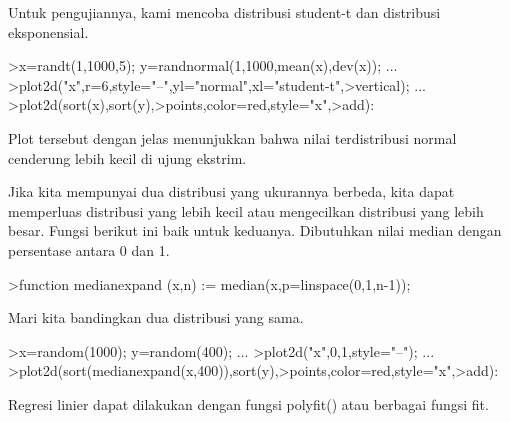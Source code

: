 \documentclass[a4paper,10pt]{article}
\begin{document}
\begin{eulernotebook}
\begin{eulercomment}
\begin{eulercomment}
\begin{eulercomment}
Untuk pengujiannya, kami mencoba distribusi student-t dan distribusi
eksponensial.
\end{eulercomment}
\begin{eulerprompt}
>x=randt(1,1000,5); y=randnormal(1,1000,mean(x),dev(x)); ...
>plot2d("x",r=6,style="--",yl="normal",xl="student-t",>vertical); ...
>plot2d(sort(x),sort(y),>points,color=red,style="x",>add):
\end{eulerprompt}
\begin{eulercomment}
Plot tersebut dengan jelas menunjukkan bahwa nilai terdistribusi
normal cenderung lebih kecil di ujung ekstrim.

Jika kita mempunyai dua distribusi yang ukurannya berbeda, kita dapat
memperluas distribusi yang lebih kecil atau mengecilkan distribusi
yang lebih besar. Fungsi berikut ini baik untuk keduanya. Dibutuhkan
nilai median dengan persentase antara 0 dan 1.
\end{eulercomment}
\begin{eulerprompt}
>function medianexpand (x,n) := median(x,p=linspace(0,1,n-1));
\end{eulerprompt}
\begin{eulercomment}
Mari kita bandingkan dua distribusi yang sama.
\end{eulercomment}
\begin{eulerprompt}
>x=random(1000); y=random(400); ...
>plot2d("x",0,1,style="--"); ...
>plot2d(sort(medianexpand(x,400)),sort(y),>points,color=red,style="x",>add):
\end{eulerprompt}
\begin{eulercomment}
Regresi linier dapat dilakukan dengan fungsi polyfit() atau berbagai
fungsi fit.


\end{eulercomment}
\end{eulercomment}
\end{eulercomment}
\end{eulernotebook}
\end{document}

